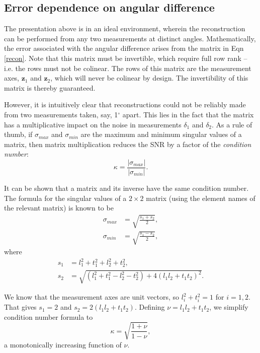 \documentclass[preprint,NumberedRefs]{JASA}
\begin{document}
\subsection{Error dependence on angular difference}
\par{The presentation above is in an ideal environment, wherein the reconstruction can be performed from any two measurements at distinct angles. Mathematically, the error associated with the angular difference arises from the matrix in Eqn \ref{recon}. Note that this matrix must be invertible, which require full row rank -- i.e. the rows must not be colinear. The rows of this matrix are the measurement axes, $\mathbf{z}_1$ and $\mathbf{z}_2$, which will never be colinear by design. The invertibility of this matrix is thereby guaranteed.}
\par{However, it is intuitively clear that reconstructions could not be reliably made from two measurements taken, say, 1$^\circ$ apart. This lies in the fact that the matrix has a multiplicative impact on the noise in measurements $\delta_1$ and $\delta_2$. As a rule of thumb, if $\sigma_{max}$ and $\sigma_{min}$ are the maximum and minimum singular values of a matrix, then matrix multiplication reduces the SNR by a factor of the \textit{condition number}:}
\begin{equation}
	\kappa = \frac{|\sigma_{max}|}{|\sigma_{min}|}.
\end{equation}
\par{It can be shown that a matrix and its inverse have the same condition number. The formula for the singular values of a $2\times2$ matrix (using the element names of the relevant matrix) is known to be
	\begin{align}
		\sigma_{max} &= \sqrt{\frac{s_1+s_2}{2}},\\
		\sigma_{min} &= \sqrt{\frac{s_1-s_2}{2}},
	\end{align}
where
	\begin{align}
		s_1 &= l_1^2 + t_1^2 + l_2^2 + t_2^2,\\
		s_2 &= \sqrt{(l_1^2 + t_1^2 - l_2^2 - t_2^2) + 4(l_1l_2 + t_1t_2)^2}.
	\end{align}
}
\par{We know that the measurement axes are unit vectors, so $l_i^2+t_i^2 = 1$ for $i=1,2$. That gives $s_1 = 2$ and $s_2 = 2(l_1l_2 + t_1t_2)$. Defining $\nu = l_1l_2+t_1t_2$, we simplify condition number formula to
	\begin{equation}
		\kappa = \sqrt{\frac{1+\nu}{1-\nu}},
	\end{equation}
a monotonically increasing function of $\nu$.
}
\end{document}
